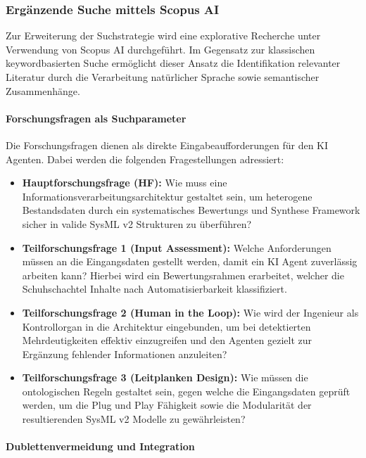 \endgroup


\subsubsection{Ergänzende Suche mittels Scopus AI}

Zur Erweiterung der Suchstrategie wird eine explorative Recherche unter Verwendung von Scopus AI durchgeführt. Im Gegensatz zur klassischen keywordbasierten Suche ermöglicht dieser Ansatz die Identifikation relevanter Literatur durch die Verarbeitung natürlicher Sprache sowie semantischer Zusammenhänge.

\paragraph{Forschungsfragen als Suchparameter}

Die Forschungsfragen dienen als direkte Eingabeaufforderungen für den KI Agenten. Dabei werden die folgenden Fragestellungen adressiert:

\begin{itemize}
    \item \textbf{Hauptforschungsfrage (HF):} Wie muss eine Informationsverarbeitungsarchitektur gestaltet sein, um heterogene Bestandsdaten durch ein systematisches Bewertungs und Synthese Framework sicher in valide SysML v2 Strukturen zu überführen?
    \item \textbf{Teilforschungsfrage 1 (Input Assessment):} Welche Anforderungen müssen an die Eingangsdaten gestellt werden, damit ein KI Agent zuverlässig arbeiten kann? Hierbei wird ein Bewertungsrahmen erarbeitet, welcher die Schuhschachtel Inhalte nach Automatisierbarkeit klassifiziert.
    \item \textbf{Teilforschungsfrage 2 (Human in the Loop):} Wie wird der Ingenieur als Kontrollorgan in die Architektur eingebunden, um bei detektierten Mehrdeutigkeiten effektiv einzugreifen und den Agenten gezielt zur Ergänzung fehlender Informationen anzuleiten?
    \item \textbf{Teilforschungsfrage 3 (Leitplanken Design):} Wie müssen die ontologischen Regeln gestaltet sein, gegen welche die Eingangsdaten geprüft werden, um die Plug und Play Fähigkeit sowie die Modularität der resultierenden SysML v2 Modelle zu gewährleisten?
\end{itemize}

\paragraph{Dublettenvermeidung und Integration}

